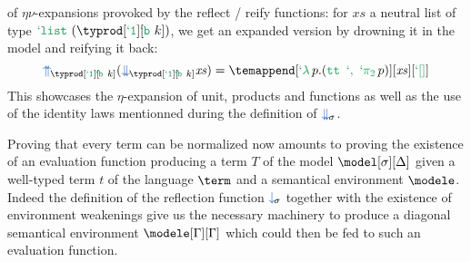 \begin{example} of $\eta\nu$-expansions provoked by the reflect / reify functions:
for $\mathit{xs}$ a neutral list of type $\gdef\pub{\typrod[\tyunit][\hspace{-3pt}\tybase]}\def\Tpub{\tylist[(\pub)]}\Tpub$,
we get an expanded version by drowning it in the model and reifying it back:
$$\listreify[\pub] (\listreflect[\pub] \mathit{xs}) = \temappend[\protect{\telam p. (\teunit \tepair \tepide p)}][\mathit{xs}][\tenil]$$
This showcases the $\eta$-expansion of unit, products and functions as well as the
use of the identity laws mentionned during the definition of $\listreflect$.
\end{example}

Proving that every term can be normalized now amounts to proving the existence of
an evaluation function producing a term $T$ of the model $\model[\sigma][\Delta]$
given a well-typed term $t$ of the language $\term$ and a semantical environment
$\modele$. Indeed the definition of the reflection function $\reflect$ together
with the existence of environment weakenings give us the necessary machinery to
produce a diagonal semantical environment $\modele[\Gamma][\Gamma]$ which could
then be fed to such an evaluation function.

